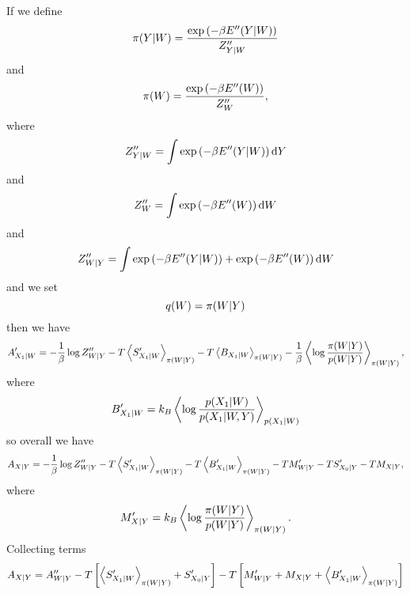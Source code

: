 \documentclass[]{article}
\begin{document}
If we define 
\[
\pi(Y | W) = \frac{\exp\left(-\beta E^{\prime\prime}(Y |W)\right)}{Z^{\prime\prime}_{Y | W}}
\] 
and 
\[
\pi(W) = \frac{\exp\left(-\beta E^{\prime\prime}(W)\right)}{Z^{\prime\prime}_{W}},
\] 
where 
\[
Z^{\prime\prime}_{Y | W} = \int \exp\left(-\beta E^{\prime\prime}(Y |W)\right) \text{d}Y
\] 
and 
\[
Z^{\prime\prime}_{W} = \int \exp\left(-\beta E^{\prime\prime}(W)\right) \text{d}W
\] 
and 
\[
Z^{\prime\prime}_{W|Y} = \int \exp\left(-\beta E^{\prime\prime}(Y |W)\right)  + \exp\left(-\beta E^{\prime\prime}(W)\right) \text{d}W
\] 
and we set 
\[
q(W) = \pi(W |Y)
\] 
then we have 
\[
A^\prime_{X_1|W} = -\frac{1}{\beta} \log  Z^{\prime\prime}_{W|Y} - T\left\langle S^\prime_{X_1 | W} \right\rangle_{\pi(W | Y)} - T\left\langle B_{X_1 | W} \right\rangle_{\pi(W | Y)}  - \frac{1}{\beta}\left\langle \log\frac{\pi(W|Y)}{p(W|Y)} \right\rangle_{\pi(W|Y)},
\] 
where 
\[
B^\prime_{X_1 | W} = k_B \left\langle \log\frac{p(X_1 | W)}{p(X_1| W , Y)} \right\rangle_{p(X_1 | W)}
\] 
so overall we have 
\[
A_{X|Y} = -\frac{1}{\beta} \log  Z^{\prime\prime}_{W|Y} - T\left\langle S^\prime_{X_1 | W} \right\rangle_{\pi(W | Y)} - T\left\langle B^\prime_{X_1 | W} \right\rangle_{\pi(W | Y)}  - TM^\prime_{W|Y} - TS^\prime_{X_0|Y}- TM_{X|Y},
\] 
where 
\[
M^\prime_{X|Y} =  k_B\left\langle \log\frac{\pi(W|Y)}{p(W|Y)} \right\rangle_{\pi(W|Y)}.
\] 
Collecting terms 
\[
A_{X|Y} = A^{\prime\prime}_{W|Y} - T\left[\left\langle S^\prime_{X_1 | W} \right\rangle_{\pi(W | Y)} + S^\prime_{X_0|Y}\right]   - T\left[M^\prime_{W|Y} + M_{X|Y} + \left\langle B^\prime_{X_1 | W} \right\rangle_{\pi(W | Y)}\right]
\] 
\end{document}
